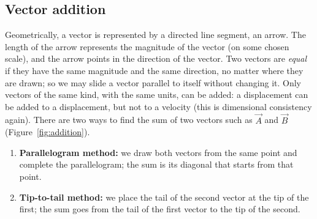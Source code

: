\documentclass[11pt,a4paper]{article}
\begin{document}
\subsection{Vector addition}

Geometrically, a vector is represented by a directed line segment, an arrow. The length of the
arrow represents the magnitude of the vector (on some chosen scale), and the arrow points in the
direction of the vector. Two vectors are \emph{equal} if they have the same magnitude and the same
direction, no matter where they are drawn; so we may slide a vector parallel to itself without
changing it. Only vectors of the same kind, with the same units, can be added: a displacement can
be added to a displacement, but not to a velocity (this is dimensional consistency again). There
are two ways to find the sum of two vectors such as $\vec{A}$ and $\vec{B}$
(Figure~\ref{fig:addition}).
\begin{enumerate}
  \item \textbf{Parallelogram method:} we draw both vectors from the same point and complete the
    parallelogram; the sum is its diagonal that starts from that point.
  \item \textbf{Tip-to-tail method:} we place the tail of the second vector at the tip of the first;
    the sum goes from the tail of the first vector to the tip of the second.
\end{enumerate}
\end{document}
